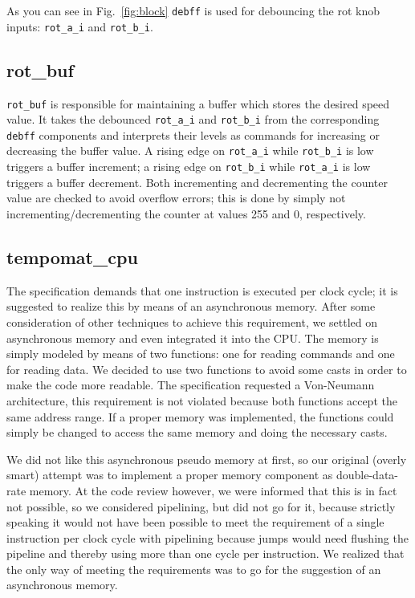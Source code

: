 \documentclass[a4paper,10pt]{scrartcl}
\begin{document}
As you can see in Fig.\ \ref{fig:block} \texttt{debff} is used for debouncing the rot knob inputs: \texttt{rot\_a\_i} and \texttt{rot\_b\_i}.

\subsection{rot\_buf}
\label{sec:rot_buf}

\texttt{rot\_buf} is responsible for maintaining a buffer which stores the desired speed value. 
It takes the debounced \texttt{rot\_a\_i} and \texttt{rot\_b\_i} from the corresponding \texttt{debff} components and interprets their levels as commands for increasing or decreasing the buffer value. 
A rising edge on \texttt{rot\_a\_i} while \texttt{rot\_b\_i} is low triggers a buffer increment; 
a rising edge on \texttt{rot\_b\_i} while \texttt{rot\_a\_i} is low triggers a buffer decrement. 
Both incrementing and decrementing the counter value are checked to avoid overflow errors; 
this is done by simply not incrementing/decrementing the counter at values 255 and 0, respectively. 

\subsection{tempomat\_cpu}
\label{sec:tempomat_cpu}
The specification demands that one instruction is executed per clock cycle; 
it is suggested to realize this by means of an asynchronous memory. 
After some consideration of other techniques to achieve this requirement, we settled on asynchronous memory and even integrated it into the CPU. 
The memory is simply modeled by means of two functions: one for reading commands and one for reading data. 
We decided to use two functions to avoid some casts in order to make the code more readable. 
The specification requested a Von-Neumann architecture, this requirement is not violated because both functions accept the same address range. 
If a proper memory was implemented, the functions could simply be changed to access the same memory and doing the necessary casts.

We did not like this asynchronous pseudo memory at first, so our original (overly smart) attempt was to implement a proper memory component as double-data-rate memory. 
At the code review however, we were informed that this is in fact not possible, so we considered pipelining, but did not go for it, because strictly speaking it would not have been possible to meet the requirement of a single instruction per clock cycle with pipelining because jumps would need  flushing the pipeline and thereby using more than one cycle per instruction. 
We realized that the only way of meeting the requirements was to go for the suggestion of an asynchronous memory. 
\end{document}
